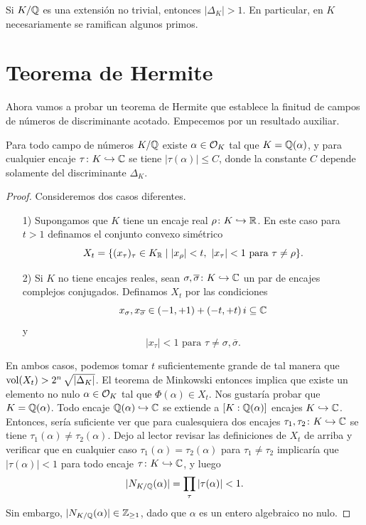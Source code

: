 \begin{teorema}[Minkowski]
  Si $K/\mathbb{Q}$ es una extensión no trivial, entonces $|\Delta_K| > 1$.
  En particular, en $K$ necesariamente se ramifican algunos primos.
\end{teorema}


\section{Teorema de Hermite}

Ahora vamos a probar un teorema de Hermite que establece la finitud de campos de
números de discriminante acotado. Empecemos por un resultado auxiliar.

\begin{lema}
  Para todo campo de números $K/\mathbb{Q}$ existe $\alpha \in \mathcal{O}_K$ tal que
  $K = \mathbb{Q} (\alpha)$, y para cualquier encaje $\tau\colon K\hookrightarrow \mathbb{C}$
  se tiene $|\tau (\alpha)| \le C$, donde la constante $C$ depende solamente
  del discriminante $\Delta_K$.

  \begin{proof}
    Consideremos dos casos diferentes.

    \begin{enumerate}
    \item[1)] Supongamos que $K$ tiene un encaje real
      $\rho\colon K \hookrightarrow \mathbb{R}$. En este caso para $t > 1$ definamos
      el conjunto convexo simétrico
      $$X_t = \{ (x_\tau)_\tau \in K_{\mathbb{R}} \mid |x_\rho| < t, ~ |x_\tau| < 1\text{ para }\tau \ne \rho \}.$$

    \item[2)] Si $K$ no tiene encajes reales, sean
      $\sigma, \overline{\sigma}\colon K \hookrightarrow \mathbb{C}$ un par de encajes
      complejos conjugados. Definamos $X_t$ por las condiciones
      $$x_\sigma, x_{\overline{\sigma}} \in (-1, +1) + (-t, +t)\,i \subseteq \mathbb{C}$$
      y
      $$|x_\tau| < 1\text{ para }\tau \ne \sigma,\overline{\sigma}.$$
    \end{enumerate}

    En ambos casos, podemos tomar $t$ suficientemente grande de tal manera que
    $\operatorname{vol} (X_t) > 2^n \, \sqrt{|\Delta_K|}$. El teorema de Minkowski entonces
    implica que existe un elemento no nulo $\alpha \in \mathcal{O}_K$ tal que
    $\Phi (\alpha) \in X_t$. Nos gustaría probar que $K = \mathbb{Q} (\alpha)$.
    Todo encaje $\mathbb{Q} (\alpha) \hookrightarrow \mathbb{C}$ se extiende a
    $[K : \mathbb{Q} (\alpha)]$ encajes $K \hookrightarrow \mathbb{C}$. Entonces, sería
    suficiente ver que para cualesquiera dos encajes
    $\tau_1,\tau_2\colon K \hookrightarrow \mathbb{C}$ se tiene
    $\tau_1 (\alpha) \ne \tau_2 (\alpha)$. Dejo al lector revisar las
    definiciones de $X_t$ de arriba y verificar que en cualquier caso
    $\tau_1 (\alpha) = \tau_2 (\alpha)$ para $\tau_1 \ne \tau_2$ implicaría que
    $|\tau (\alpha)| < 1$ para todo encaje $\tau\colon K\hookrightarrow \mathbb{C}$,
    y luego
    $$|N_{K/\mathbb{Q}} (\alpha)| = \prod_\tau |\tau (\alpha)| < 1.$$
    Sin embargo, $|N_{K/\mathbb{Q}} (\alpha)| \in \mathbb{Z}_{\ge 1}$, dado que $\alpha$ es
    un entero algebraico no nulo.


\end{proof}
\end{lema}
